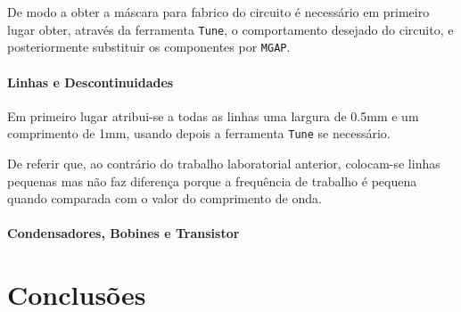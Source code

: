 \documentclass[11pt]{article}
\numberwithin{equation}{section}
\begin{document}
De modo a obter a máscara para fabrico do circuito é necessário em primeiro lugar obter, através da ferramenta \texttt{Tune}, o comportamento desejado do circuito, e posteriormente substituir os componentes por \texttt{MGAP}.

\paragraph{Linhas e Descontinuidades} \hspace{0pt} 

Em primeiro lugar atribui-se a todas as linhas uma largura de 0.5mm e um comprimento de 1mm, usando depois a ferramenta \texttt{Tune} se necessário.

De referir que, ao contrário do trabalho laboratorial anterior, colocam-se linhas pequenas mas não faz diferença porque a frequência de trabalho é pequena quando comparada com o valor do comprimento de onda.

\paragraph{Condensadores, Bobines e Transistor} \hspace{0pt} 

\section{Conclusões}
\end{document}
